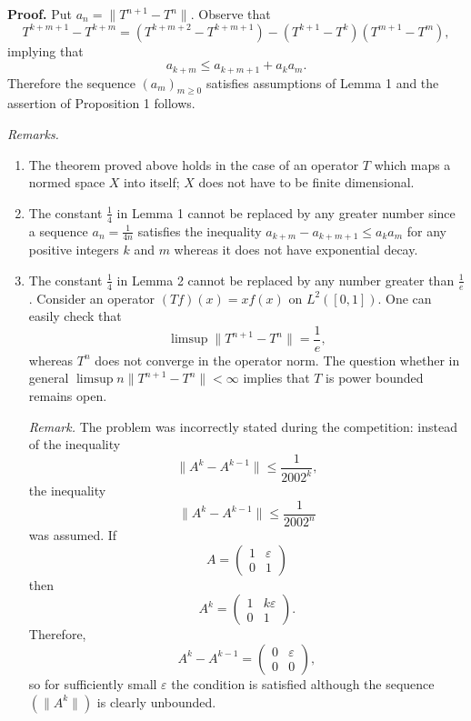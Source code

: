 \documentclass{article}
\begin{document}
\textbf{Proof.}
Put \( a_n = \|T^{n+1} - T^n\| \). Observe that
\[
T^{k+m+1} - T^{k+m} = (T^{k+m+2} - T^{k+m+1}) - (T^{k+1} - T^k)(T^{m+1} - T^m),
\]
implying that
\[
a_{k+m} \leq a_{k+m+1} + a_k a_m.
\]
Therefore the sequence \( (a_m)_{m \geq 0} \) satisfies assumptions of Lemma 1 and the assertion of Proposition 1 follows.

\textit{Remarks.}
\begin{enumerate}
    \item The theorem proved above holds in the case of an operator \( T \) which maps a normed space \( X \) into itself; \( X \) does not have to be finite dimensional.
    \item The constant \( \frac{1}{4} \) in Lemma 1 cannot be replaced by any greater number since a sequence \( a_n = \frac{1}{4n} \) satisfies the inequality \( a_{k+m} - a_{k+m+1} \leq a_k a_m \) for any positive integers \( k \) and \( m \) whereas it does not have exponential decay.
    \item The constant \( \frac{1}{4} \) in Lemma 2 cannot be replaced by any number greater than \( \frac{1}{e} \). Consider an operator \( (Tf)(x) = x f(x) \) on \( L^2([0,1]) \).
    One can easily check that
\[
\limsup \|T^{n+1} - T^n\| = \frac{1}{e},
\]
whereas \( T^n \) does not converge in the operator norm. The question whether in general \(\limsup n \|T^{n+1} - T^n\| < \infty\) implies that \( T \) is power bounded remains open.

\textit{Remark.}
The problem was incorrectly stated during the competition: instead of the inequality
\[
\|A^k - A^{k-1}\| \leq \frac{1}{2002^k},
\]
the inequality
\[
\|A^k - A^{k-1}\| \leq \frac{1}{2002^n}
\]
was assumed. If
\[
A = \begin{pmatrix}
1 & \varepsilon \\
0 & 1
\end{pmatrix}
\]
then
\[
A^k = \begin{pmatrix}
1 & k\varepsilon \\
0 & 1
\end{pmatrix}.
\]
Therefore,
\[
A^k - A^{k-1} = \begin{pmatrix}
0 & \varepsilon \\
0 & 0
\end{pmatrix},
\]
so for sufficiently small \( \varepsilon \) the condition is satisfied
although the sequence \( (\|A^k\|) \) is clearly unbounded.

\end{enumerate}
\end{document}
